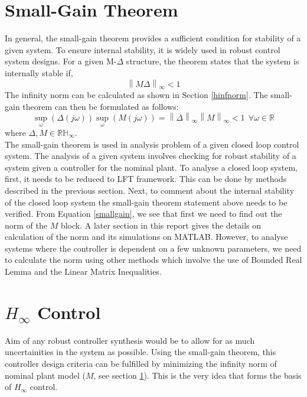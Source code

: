 \documentclass[a4paper,12pt]{article}
\newcommand\norm[1]{\left\lVert#1\right\rVert}
\begin{document}
		\section{Small-Gain Theorem}\label{small-gain} In general, the small-gain theorem provides a sufficient condition for stability of a given system. To ensure internal stability, it is widely used in robust control system designs. For a given M-$\Delta$ structure, the theorem states that the system is internally stable if, 
		\begin{equation}
			\norm{M\Delta}_{\infty} < 1
		\end{equation}
		The infinity norm can be calculated as shown in Section \ref{hinfnorm}. The small-gain theorem can then be formulated as follows:
		\begin{equation}
			\sup_{\omega}(\Delta(j\omega)) \sup_{\omega}(M(j\omega)) = \norm{\Delta}_{\infty}\norm{M}_{\infty} < 1 \: \: \forall \omega \in \mathbb{R}
			\label{smallgain}
		\end{equation}
		where $\Delta, M \in \mathbb{RH}_{\infty}$.\\
		The small-gain theorem is used in analysis problem of a given closed loop control system. The analysis of a given system involves checking for robust stability of a system given a controller for the nominal plant. To analyse a closed loop system, first, it needs to be reduced to LFT framework. This can be done by methods described in the previous section. Next, to comment about the internal stability of the closed loop system the small-gain theorem statement above needs to be verified. From Equation \ref{smallgain}, we see that first we need to find out the norm of the $M$ block.  A later section in this report gives the details on calculation of the norm and its simulations on MATLAB. However, to analyse systems where the controller is dependent on a few unknown parameters, we need to calculate the norm using other methods which involve the use of Bounded Real Lemma and the Linear Matrix Inequalities. 
		\section{$H_{\infty}$ Control} Aim of any robust controller synthesis would be to allow for as much uncertainities in the system as possible. Using the small-gain theorem, this controller design criteria can be fulfilled by minimizing the infinity norm of nominal plant model ($M$, see section \ref{small-gain}). This is the very idea that forms the basis of $H_{\infty}$  control.
\end{document}
